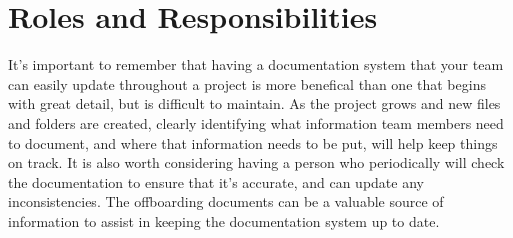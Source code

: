 \documentclass[
]{book}
\begin{document}
\hypertarget{roles-and-responsibilities-6}{%
\section*{Roles and Responsibilities}\label{roles-and-responsibilities-6}}

It's important to remember that having a documentation system that your team can easily update throughout a project is more benefical than one that begins with great detail, but is difficult to maintain. As the project grows and new files and folders are created, clearly identifying what information team members need to document, and where that information needs to be put, will help keep things on track. It is also worth considering having a person who periodically will check the documentation to ensure that it's accurate, and can update any inconsistencies. The offboarding documents can be a valuable source of information to assist in keeping the documentation system up to date.
\end{document}
